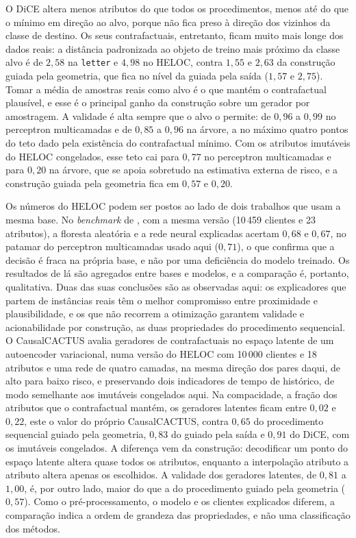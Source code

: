 O DiCE altera menos atributos do que todos os procedimentos, menos até do que o mínimo em direção ao alvo, porque não fica preso à direção dos vizinhos da classe de destino. Os seus contrafactuais, entretanto, ficam muito mais longe dos dados reais: a distância padronizada ao objeto de treino mais próximo da classe alvo é de $2{,}58$ na \texttt{letter} e $4{,}98$ no HELOC, contra $1{,}55$ e $2{,}63$ da construção guiada pela geometria, que fica no nível da guiada pela saída ($1{,}57$ e $2{,}75$). Tomar a média de amostras reais como alvo é o que mantém o contrafactual plausível, e esse é o principal ganho da construção sobre um gerador por amostragem. A validade é alta sempre que o alvo o permite: de $0{,}96$ a $0{,}99$ no perceptron multicamadas e de $0{,}85$ a $0{,}96$ na árvore, a no máximo quatro pontos do teto dado pela existência do contrafactual mínimo. Com os atributos imutáveis do HELOC congelados, esse teto cai para $0{,}77$ no perceptron multicamadas e para $0{,}20$ na árvore, que se apoia sobretudo na estimativa externa de risco, e a construção guiada pela geometria fica em $0{,}57$ e $0{,}20$.

Os números do HELOC podem ser postos ao lado de dois trabalhos que usam a mesma base. No \textit{benchmark} de \citet{Guidotti2022}, com a mesma versão (10\,459 clientes e 23 atributos), a floresta aleatória e a rede neural explicadas acertam $0{,}68$ e $0{,}67$, no patamar do perceptron multicamadas usado aqui ($0{,}71$), o que confirma que a decisão é fraca na própria base, e não por uma deficiência do modelo treinado. Os resultados de lá são agregados entre bases e modelos, e a comparação é, portanto, qualitativa. Duas das suas conclusões são as observadas aqui: os explicadores que partem de instâncias reais têm o melhor compromisso entre proximidade e plausibilidade, e os que não recorrem a otimização garantem validade e acionabilidade por construção, as duas propriedades do procedimento sequencial. O CausalCACTUS \citep{Wang2026} avalia geradores de contrafactuais no espaço latente de um autoencoder variacional, numa versão do HELOC com 10\,000 clientes e 18 atributos e uma rede de quatro camadas, na mesma direção dos pares daqui, de alto para baixo risco, e preservando dois indicadores de tempo de histórico, de modo semelhante aos imutáveis congelados aqui. Na compacidade, a fração dos atributos que o contrafactual mantém, os geradores latentes ficam entre $0{,}02$ e $0{,}22$, este o valor do próprio CausalCACTUS, contra $0{,}65$ do procedimento sequencial guiado pela geometria, $0{,}83$ do guiado pela saída e $0{,}91$ do DiCE, com os imutáveis congelados. A diferença vem da construção: decodificar um ponto do espaço latente altera quase todos os atributos, enquanto a interpolação atributo a atributo altera apenas os escolhidos. A validade dos geradores latentes, de $0{,}81$ a $1{,}00$, é, por outro lado, maior do que a do procedimento guiado pela geometria ($0{,}57$). Como o pré-processamento, o modelo e os clientes explicados diferem, a comparação indica a ordem de grandeza das propriedades, e não uma classificação dos métodos.

